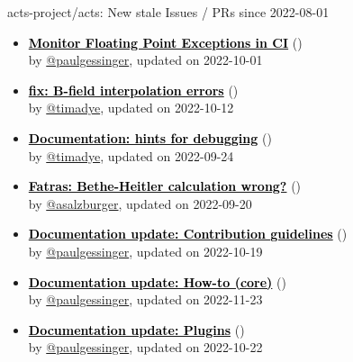 \begin{frame}[allowframebreaks]{ acts-project/acts: New stale Issues / PRs since 2022-08-01 }
\begin{itemize}
    \item\iss\prstale\textbf{\href{https://github.com/acts-project/acts/issues/1481}{\textcolor{black}{Monitor Floating Point Exceptions in CI}}}
    (\href{https://github.com/acts-project/acts/issues/1481}{}) \\
    by \href{https://github.com/paulgessinger}{@paulgessinger}, updated on 2022-10-01

    \item\propen\prwip\prstale\textbf{\href{https://github.com/acts-project/acts/pull/1467}{\textcolor{black}{fix: B-field interpolation errors}}}
    (\href{https://github.com/acts-project/acts/pull/1467}{}) \\
    by \href{https://github.com/timadye}{@timadye}, updated on 2022-10-12

    \item\iss\prstale\textbf{\href{https://github.com/acts-project/acts/issues/1463}{\textcolor{black}{Documentation: hints for debugging}}}
    (\href{https://github.com/acts-project/acts/issues/1463}{}) \\
    by \href{https://github.com/timadye}{@timadye}, updated on 2022-09-24

    \item\iss\prstale\textbf{\href{https://github.com/acts-project/acts/issues/1437}{\textcolor{black}{Fatras: Bethe-Heitler calculation wrong?}}}
    (\href{https://github.com/acts-project/acts/issues/1437}{}) \\
    by \href{https://github.com/asalzburger}{@asalzburger}, updated on 2022-09-20

    \item\iss\prstale\textbf{\href{https://github.com/acts-project/acts/issues/1423}{\textcolor{black}{Documentation update: Contribution guidelines}}}
    (\href{https://github.com/acts-project/acts/issues/1423}{}) \\
    by \href{https://github.com/paulgessinger}{@paulgessinger}, updated on 2022-10-19

    \item\iss\prstale\textbf{\href{https://github.com/acts-project/acts/issues/1422}{\textcolor{black}{Documentation update: How-to (core)}}}
    (\href{https://github.com/acts-project/acts/issues/1422}{}) \\
    by \href{https://github.com/paulgessinger}{@paulgessinger}, updated on 2022-11-23

    \item\iss\prstale\textbf{\href{https://github.com/acts-project/acts/issues/1421}{\textcolor{black}{Documentation update: Plugins}}}
    (\href{https://github.com/acts-project/acts/issues/1421}{}) \\
    by \href{https://github.com/paulgessinger}{@paulgessinger}, updated on 2022-10-22


\end{itemize}
\end{frame}
